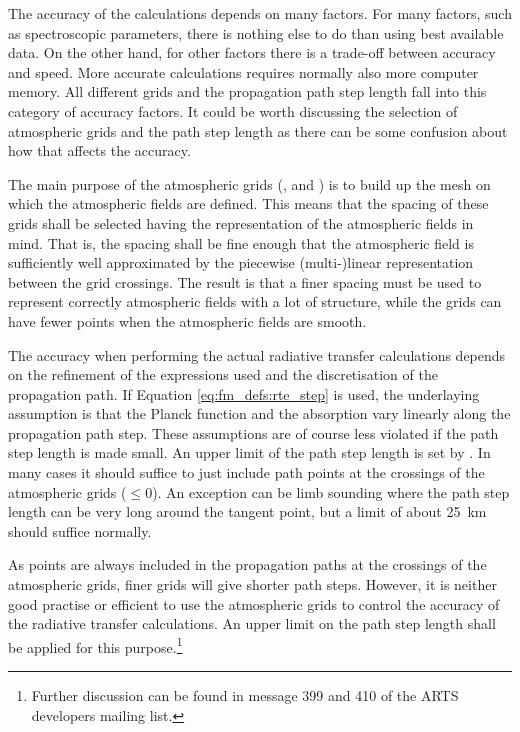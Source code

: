 The accuracy of the calculations depends on many factors. For many
factors, such as spectroscopic parameters, there is nothing else to do
than using best available data. On the other hand, for other factors
there is a trade-off between accuracy and speed. More accurate
calculations requires normally also more computer memory. All
different grids and the propagation path step length fall into this
category of accuracy factors. It could be worth discussing the
selection of atmospheric grids and the path step length as there can
be some confusion about how that affects the accuracy.

The main purpose of the atmospheric grids (,
 and ) is to build up the
mesh on which the atmospheric fields are defined. This means that the
spacing of these grids shall be selected having the representation of
the atmospheric fields in mind. That is, the spacing shall be fine
enough that the atmospheric field is sufficiently well approximated by
the piecewise (multi-)linear representation between the grid
crossings. The result is that a finer spacing must be used to
represent correctly atmospheric fields with a lot of structure, while
the grids can have fewer points when the atmospheric fields are
smooth. 

The accuracy when performing the actual radiative transfer calculations depends
on the refinement of the expressions used and the discretisation of the
propagation path. If Equation \ref{eq:fm_defs:rte_step} is used, the
underlaying assumption is that the Planck function and the absorption vary
linearly along the propagation path step. These assumptions are of course less
violated if the path step length is made small. An upper limit of the path step
length is set by . In many cases it should suffice to
just include path points at the crossings of the atmospheric grids
($\leq0$). An exception can be limb sounding where the
path step length can be very long around the tangent point, but a limit of
about 25~km should suffice normally.

As points are always included in the propagation paths at the
crossings of the atmospheric grids, finer grids will give shorter path
steps. However, it is neither good practise or efficient to use the
atmospheric grids to control the accuracy of the radiative transfer
calculations. An upper limit on the path step length shall be applied
for this purpose.\footnote{Further discussion can be found in message
  399 and 410 of the ARTS developers mailing list.}


